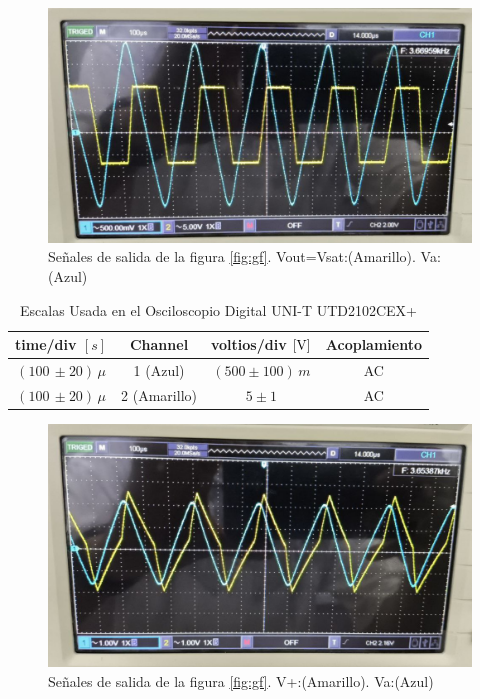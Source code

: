             \begin{figure}[H]
                \centering
                \renewcommand{\figurename}{Imagen}
                \includegraphics[width=15cm]{Imagenes/exp_gf.png}
                \caption{Señales de salida de la figura \ref{fig:gf}. Vout=Vsat:(Amarillo). Va:(Azul)}
                \label{fig:exp_gf}
            \end{figure}

            \begin{table}[H]
                \centering
                \begin{tabular}{|c|c|c|c|}
                    \hline
                    \textbf{time/div} $[s]$ & \textbf{Channel} & \textbf{voltios/div $[\volt]$} & \textbf{Acoplamiento} \\ \hline
                    $(100 \, \pm 20) \, \mu  $ & 1 (Azul)  &   $(500 \pm 100) \, m   $ & AC \\ \hline  
                    $(100 \, \pm 20 )\, \mu  $ & 2 (Amarillo)  &   $5 \pm 1   $ & AC \\ \hline  
                \end{tabular}
                \caption{Escalas Usada en el Osciloscopio Digital UNI-T UTD2102CEX+}
                \label{tab:escala_gf}
            \end{table}


             
            \begin{figure}[H]
                \centering
                \renewcommand{\figurename}{Imagen}
                \includegraphics[width=15cm]{Imagenes/exp_gf2.png}
                \caption{Señales de salida de la figura \ref{fig:gf}. V+:(Amarillo). Va:(Azul)}
                \label{fig:exp_gf2}
            \end{figure}

